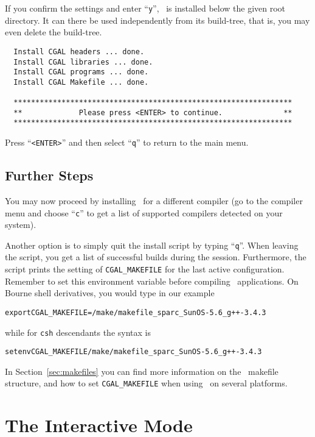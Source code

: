 If you confirm the settings and enter ``\texttt{y}'', \cgal\ is
installed below the given root directory. It can there be used
independently from its build-tree, that is, you may even delete the
build-tree.

{\ccTexHtml{\scriptsize}{}
\begin{verbatim}
  Install CGAL headers ... done.
  Install CGAL libraries ... done.
  Install CGAL programs ... done.
  Install CGAL Makefile ... done.

  ****************************************************************
  **             Please press <ENTER> to continue.              **
  ****************************************************************
\end{verbatim}
}

Press ``\texttt{<ENTER>}'' and then select ``\texttt{q}'' to return to
the main menu.

\subsection{Further Steps\label{sec:further}}

You may now proceed by installing \cgal\ for a different compiler (go
to the compiler menu and choose ``\texttt{c}'' to get a list of
supported compilers detected on your system).

Another option is to simply quit the install script by typing
``\texttt{q}''. When leaving the script, you get a list of successful
builds during the session.  Furthermore, the script prints the setting
of \texttt{CGAL\_MAKEFILE} for the last active configuration. Remember
to set this environment variable before compiling \cgal\ applications.
On Bourne shell derivatives, you would type in our example
\begin{alltt}
      export CGAL_MAKEFILE=\cgaldir/make/makefile_sparc_SunOS-5.6_g++-3.4.3
\end{alltt}
while for \texttt{csh} descendants the syntax is
\begin{alltt}
      setenv CGAL_MAKEFILE \cgaldir/make/makefile_sparc_SunOS-5.6_g++-3.4.3
\end{alltt}
In Section~\ref{sec:makefiles} you can find more information on the
\cgal\ makefile structure, and how to set \texttt{CGAL\_MAKEFILE} when
using \cgal\ on several platforms.

\section{The Interactive Mode\label{sec:interactive-mode}}

